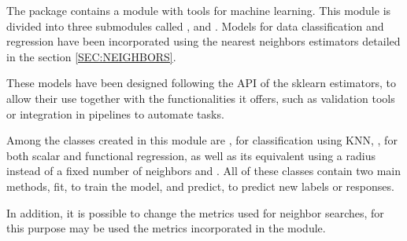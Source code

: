 

The package contains a module with tools for machine learning.
This module is divided into three submodules called ,
 and .
Models for data classification and regression have been incorporated using
the nearest neighbors estimators detailed in the section \ref{SEC:NEIGHBORS}.

These models have been designed following the API of the sklearn estimators,
to allow their use together with the functionalities it offers, such as
validation tools or integration in pipelines to automate tasks.

Among the classes created in this module are ,
for classification using KNN, ,
for both scalar and functional regression,
as well as its equivalent using a radius instead of a fixed number of neighbors
 and .
All of these classes contain two main methods, fit, to train the model,
and predict, to predict new labels or responses.

In addition, it is possible to change the metrics used for neighbor searches,
for this purpose  may be used the metrics incorporated in the 
module.
